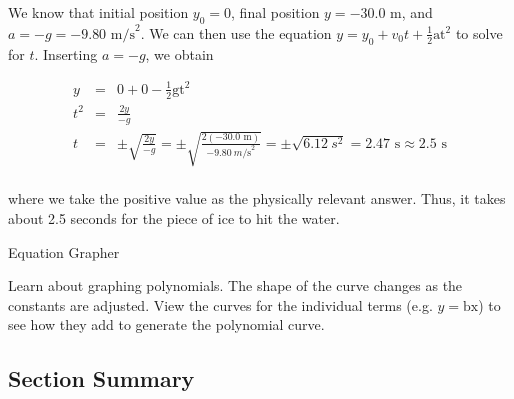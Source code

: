 \documentclass[
]{book}
\begin{document}
\leavevmode{}%
We know that initial position \({y_{0} = 0}{}\), final position
\({y = \text{−30}\text{.}\text{0\ m}}{}\), and
\({{a = {- g}} = {- 9}}\text{.}\text{80\ m/s}^{2}\). We can then use the
equation \({y = {y_{0} + v_{0}}}{t + \frac{1}{2}}\text{at}^{2}\) to solve
for \(t\). Inserting \({a = {- g}}{}\), we obtain

\leavevmode{}%
\[\begin{array}{lll}
y & = & {{{0 + 0} - \frac{1}{2}}\text{gt}^{2}} \\
t^{2} & = & \frac{2y}{- g} \\
t & = & {{{{\pm \sqrt{\frac{2y}{- g}} = {\pm \sqrt{\frac{2( - \text{30.0\ m})}{- 9.80\ m\text{/s}^{2}}}}} = {\pm \sqrt{\text{6.12}\ s^{2}}}} = \text{2.47\ s} \approx}\text{2.5\ s}} \\
\end{array}\]

where we take the positive value as the physically relevant answer.
Thus, it takes about 2.5 seconds for the piece of ice to hit the water.

\hypertarget{fs-id2006949}{}
Equation Grapher

Learn about graphing polynomials. The shape of the curve changes as the
constants are adjusted. View the curves for the individual terms (e.g.
\({y = \text{bx}}{}\)) to see how they add to generate the polynomial
curve.

\hypertarget{graphing_polynomials}{}

\hypertarget{fs-id1822906-summary}{}
\hypertarget{section-summary-6}{%
\subsection{Section Summary}\label{section-summary-6}}
\end{document}
